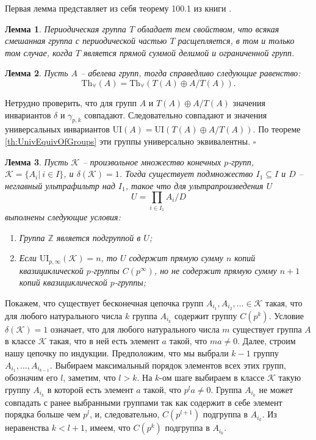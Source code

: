 \documentclass[a4paper,11pt,twoside]{article}
\newtheorem{lemma}{Лемма}[section]
\def\proof{{\noindent{\bf Доказательство.}} }
\def\K{{\mathcal{K}}}
\def\Z{{\mathbb{Z}}}
\def\Tha{{\mathrm{Th}_\forall}}
\def\ui{{\mathrm{UI}}}
\begin{document}
Первая лемма представляет из себя теорему 100.1 из книги \cite{Fuchs2}.

\begin{lemma}{\cite{Fuchs2}}\label{lemma:Fuchs}
Периодическая группа $T$ обладает тем свойством, что всякая смешанная группа с периодической частью $T$ расщепляется, в том и только том случае, когда $T$ является прямой суммой делимой и ограниченной групп.
\end{lemma}

\begin{lemma}\label{lemma:UnivEquivATA}
Пусть $A$ -- абелева групп, тогда справедливо следующие равенство:
$$\Tha(A) = \Tha(T(A) \oplus A \big/ T(A)).$$
\end{lemma}

\proof Нетрудно проверить, что для групп $A$ и $T(A) \oplus A \big/ T(A)$ значения инвариантов $\delta$ и $\gamma_{p,k}$ совпадают. Следовательно совпадают и значения универсальных инвариантов $\ui(A) = \ui(T(A) \oplus A \big/ T(A))$. По теореме \ref{th:UnivEquivOfGroups} эти группы универсально эквивалентны. $\square$

\begin{lemma}\label{lemma:delta1UltraProduct}
Пусть $\K$ -- произвольное множество конечных $p$-групп, $\K = \{A_i | \ i \in I\}$, и $\delta(\K) = 1$. Тогда существует подмножество $I_1 \subseteq I$ и $D$ -- неглавный ультрафильтр над $I_1$, такое что для ультрапроизведения $U$
$$U = \prod_{i \in I_1} A_i \Big/ D$$
выполнены следующие условия:
\begin{enumerate}
\item Группа $\Z$ является подгруппой в $U$;
\item Если $\ui_{p,\infty}(\K) = n$, то $U$ содержит прямую сумму $n$ копий квазициклической $p$-группы $C(p^\infty)$, но не содержит прямую сумму $n+1$ копий квазициклической $p$-группы;
\end{enumerate}
\end{lemma}

\proof Покажем, что существует бесконечная цепочка групп $A_{i_1}, A_{i_2}, \ldots \in \K$ такая, что для любого натурального числа $k$ группа $A_{i_k}$ содержит группу $C(p^k)$. Условие $\delta(\K) = 1$ означает, что для любого натурального числа $m$ существует группа $A$ в классе $\K$ такая, что в ней есть элемент $a$ такой, что $ma \neq 0$. Далее, строим нашу цепочку по индукции. Предположим, что мы выбрали $k-1$ группу $A_{i_1}, \ldots, A_{i_{k-1}}$. Выбираем максимальный порядок элементов всех этих групп, обозначим его $l$, заметим, что $l > k$. На $k$-ом шаге выбираем в классе $\K$ такую группу $A_{i_k}$ в которой есть элемент $a$ такой, что $p^{l} a \neq 0$. Группа $A_{i_k}$ не может совпадать с ранее выбранными группами так как содержит в себе элемент порядка больше чем $p^l$, и, следовательно, $C(p^{l+1})$ подгруппа в $A_{i_k}$. Из неравенства $k < l+1$, имеем, что $C(p^k)$ подгруппа в $A_{i_k}$.
\end{document}
